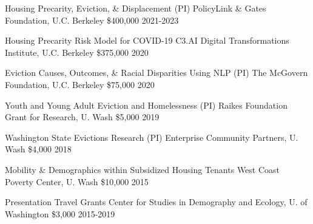 



\begin{cvhonors}

  \cvhonor
    {Housing Precarity, Eviction, \& Displacement (PI)} %
    {PolicyLink \& Gates Foundation, U.C. Berkeley} %
    {\$400,000} %
    {2021-2023} %

  \cvhonor
    {Housing Precarity Risk Model for COVID-19} %
    {C3.AI Digital Transformations Institute, U.C. Berkeley} %
    {\$375,000} %
    {2020} %

  \cvhonor
    {Eviction Causes, Outcomes, \& Racial Disparities Using NLP (PI)} %
    {The McGovern Foundation, U.C. Berkeley} %
    {\$75,000} %
    {2020} %

  \cvhonor
    {Youth and Young Adult Eviction and Homelessness (PI)} %
    {Raikes Foundation Grant for Research, U. Wash} %
    {\$5,000} %
    {2019} %

  \cvhonor
    {Washington State Evictions Research (PI)} %
    {Enterprise Community Partners, U. Wash} %
    {\$4,000} %
    {2018} %

   \cvhonor
    {Mobility \& Demographics within Subsidized Housing Tenants} %
    {West Coast Poverty Center, U. Wash} %
    {\$10,000} %
    {2015} %
    
  \cvhonor
    {Presentation Travel Grants} %
    {Center for Studies in Demography and Ecology, U. of Washington} %
    {\$3,000} %
    {2015-2019} %


\end{cvhonors}


